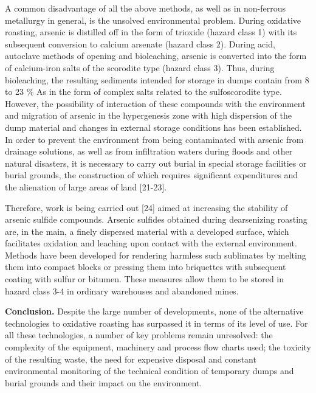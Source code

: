 \begin{multicols}{2}
A common disadvantage of all the above methods, as well as in
non-ferrous metallurgy in general, is the unsolved environmental
problem. During oxidative roasting, arsenic is distilled off in the form
of trioxide (hazard class 1) with its subsequent conversion to calcium
arsenate (hazard class 2). During acid, autoclave methods of opening and
bioleaching, arsenic is converted into the form of calcium-iron salts of
the scorodite type (hazard class 3). Thus, during bioleaching, the
resulting sediments intended for storage in dumps contain from 8 to 23
\% As in the form of complex salts related to the sulfoscorodite type.
However, the possibility of interaction of these compounds with the
environment and migration of arsenic in the hypergenesis zone with high
dispersion of the dump material and changes in external storage
conditions has been established. In order to prevent the environment
from being contaminated with arsenic from drainage solutions, as well as
from infiltration waters during floods and other natural disasters, it
is necessary to carry out burial in special storage facilities or burial
grounds, the construction of which requires significant expenditures and
the alienation of large areas of land {[}21-23{]}.

Therefore, work is being carried out {[}24{]} aimed at increasing the
stability of arsenic sulfide compounds. Arsenic sulfides obtained during
dearsenizing roasting are, in the main, a finely dispersed material with
a developed surface, which facilitates oxidation and leaching upon
contact with the external environment. Methods have been developed for
rendering harmless such sublimates by melting them into compact blocks
or pressing them into briquettes with subsequent coating with sulfur or
bitumen. These measures allow them to be stored in hazard class 3-4 in
ordinary warehouses and abandoned mines.

{\bfseries Conclusion.} Despite the large number of developments, none of
the alternative technologies to oxidative roasting has surpassed it in
terms of its level of use. For all these technologies, a number of key
problems remain unresolved: the complexity of the equipment, machinery
and process flow charts used; the toxicity of the resulting waste, the
need for expensive disposal and constant environmental monitoring of the
technical condition of temporary dumps and burial grounds and their
impact on the environment.


\end{multicols}
